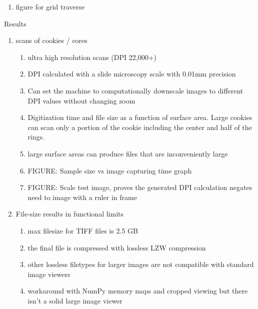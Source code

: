 \documentclass{article}
\begin{document}
\begin{outline}[enumerate]
\begin{enumerate}
\begin{enumerate}
\begin{enumerate}
				\item figure for grid traverse
				\end{enumerate}
			\end{enumerate}
		\end{enumerate}
\item Results
	\begin{enumerate}
	\item scans of cookies / cores
		\begin{enumerate}
		\item ultra high resolution scans (DPI 22,000+)
		\item DPI calculated with a slide microscopy scale with 0.01mm precision
		\item Can set the machine to computationally downscale images to different DPI values without changing zoom
		\item Digitization time and file size as a function of surface area. Large cookies can scan only a portion of the cookie including the center and half of the rings.
		\item large surface areas can produce files that are inconveniently large
		\item FIGURE: Sample size vs image capturing time graph
		\item FIGURE: Scale test image, proves the generated DPI calculation negates need to image with a ruler in frame
		\end{enumerate}
	\item File-size results in functional limits 
		\begin{enumerate}
		\item max filesize for TIFF files is 2.5 GB
		\item the final file is compressed with lossless LZW compression
		\item other lossless filetypes for larger images are not compatible with standard image viewers
		\item workaround with NumPy memory maps and cropped viewing but there isn't a solid large image viewer 

\end{enumerate}
\end{enumerate}
\end{outline}
\end{document}
